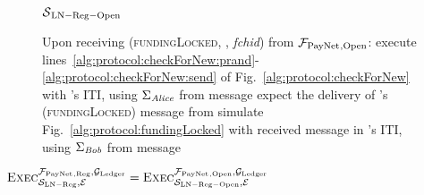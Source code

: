 \begin{figure}[H]
\begin{simulatorbox}{$\mathcal{S}{}_{\mathrm{LN - Reg - Open}}$}
\begin{algorithmic}[1]
      \State Upon receiving (\textsc{fundingLocked}, \alice, \textit{fchid})
      from $\mathcal{F}_{\mathrm{PayNet}}{}_{\mathrm{, Open}}$:
      \Indent
        \State execute
        lines~\ref{alg:protocol:checkForNew:prand}-\ref{alg:protocol:checkForNew:send}
        of Fig.~\ref{alg:protocol:checkForNew} with \alice's ITI, using
        $\Sigma_{\mathit{Alice}}$ from message
          \State expect the delivery of \alice's (\textsc{fundingLocked})
          message from \adversary
          \State simulate Fig.~\ref{alg:protocol:fundingLocked} with received
          message in \bob's ITI, using $\Sigma_{\mathit{Bob}}$ from message
        \EndIf
      \EndIndent
    \end{algorithmic}
  \end{simulatorbox}
  \caption{}
  \label{alg:sim:open}
\end{figure}

\begin{lemma}
  \label{lemma:open}
  $\textsc{Exec}^{\mathcal{F}_{\mathrm{PayNet}}{}_{\mathrm{, Reg}},
  \mathcal{G}_{\mathrm{Ledger}}}_{\mathcal{S}_{\mathrm{LN - Reg}}, \mathcal{E}} =
  \textsc{Exec}^{\mathcal{F}_{\mathrm{PayNet}}{}_{\mathrm{, Open}},
  \mathcal{G}_{\mathrm{Ledger}}}_{\mathcal{S}_{\mathrm{LN - Reg - Open}}, \mathcal{E}}$
\end{lemma}

